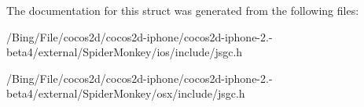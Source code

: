 The documentation for this struct was generated from the following files\-:\begin{DoxyCompactItemize}
\item 
/\-Bing/\-File/cocos2d/cocos2d-\/iphone/cocos2d-\/iphone-\/2.-\/beta4/external/\-Spider\-Monkey/ios/include/jsgc.\-h\item 
/\-Bing/\-File/cocos2d/cocos2d-\/iphone/cocos2d-\/iphone-\/2.-\/beta4/external/\-Spider\-Monkey/osx/include/jsgc.\-h\end{DoxyCompactItemize}

